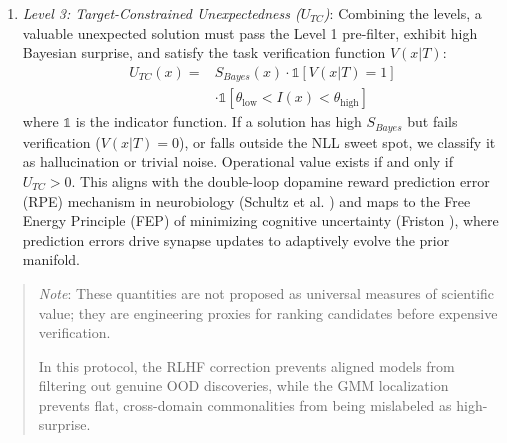 \documentclass[10pt,journal,compsoc]{IEEEtran}
\begin{document}
\begin{enumerate}
\begin{equation}
\begin{split}
S_{Bayes}(x) \approx {} & \min_{k \in \{1, \dots, K\}} \\
& d_{\text{Mahalanobis}}(\mathbf{e}(x), \boldsymbol{\mu}_k, \boldsymbol{\Sigma}_k)
\end{split}
\end{equation}
where $\boldsymbol{\mu}_k$ and $\boldsymbol{\Sigma}_k$ represent the local mean and covariance of cluster $k$, obtained by fitting a Gaussian Mixture Model (GMM) via Expectation-Maximization (EM) on the latent representation of the human scientific corpus $\mathcal{M}_H$.
\item \textit{Level 3: Target-Constrained Unexpectedness ($U_{TC}$)}: Combining the levels, a valuable unexpected solution must pass the Level 1 pre-filter, exhibit high Bayesian surprise, and satisfy the task verification function $V(x|T)$:
\begin{equation}
\begin{split}
U_{TC}(x) = {} & S_{Bayes}(x) \cdot \mathbb{1}[V(x|T) = 1] \\
               & \cdot \mathbb{1}[\theta_{\text{low}} < I(x) < \theta_{\text{high}}]
\end{split}
\end{equation}
where $\mathbb{1}$ is the indicator function. If a solution has high $S_{Bayes}$ but fails verification ($V(x|T) = 0$), or falls outside the NLL sweet spot, we classify it as hallucination or trivial noise. Operational value exists if and only if $U_{TC} > 0$. This aligns with the double-loop dopamine reward prediction error (RPE) mechanism in neurobiology (Schultz et al. \cite{schultz}) and maps to the Free Energy Principle (FEP) of minimizing cognitive uncertainty (Friston \cite{friston}), where prediction errors drive synapse updates to adaptively evolve the prior manifold.
\end{enumerate}

\begin{quote}
\textit{Note}: These quantities are not proposed as universal measures of scientific value; they are engineering proxies for ranking candidates before expensive verification.

In this protocol, the RLHF correction prevents aligned models from filtering out genuine OOD discoveries, while the GMM localization prevents flat, cross-domain commonalities from being mislabeled as high-surprise.
\end{quote}
\end{document}
